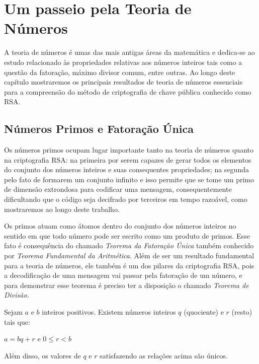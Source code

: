\chapter {Um passeio pela Teoria de N\'umeros}
\label{Num}

\hspace{7mm}A teoria de n\'umeros \'e umas das mais antigas \'areas da matem\'atica e dedica-se ao estudo relacionado \`as propriedades relativas aos n\'umeros inteiros tais como a quest\~ao da fatora\c{c}\~ao, m\'aximo divisor comum, entre outras. Ao longo deste cap\'itulo mostraremos os principais resultados de teoria de n\'umeros essenciais para a compreens\~ao do m\'etodo de criptografia de chave p\'ublica conhecido como RSA.

\section{N\'umeros Primos e Fatora\c{c}\~ao \'Unica}

\hspace{7mm}Os n\'umeros primos ocupam lugar importante tanto na teoria de n\'umeros quanto na criptografia RSA: na primeira por serem capazes de gerar todos os elementos do conjunto dos n\'umeros inteiros e suas consequentes propriedades; na segunda pelo fato de formarem um conjunto infinito e isso permite que se tome um primo de dimens\~ao extrondosa para codificar uma mensagem, consequentemente dificultando que o c\'odigo seja decifrado por terceiros em tempo razo\'avel, como mostraremos ao longo deste trabalho.

Os primos atuam como \'atomos dentro do conjunto dos n\'umeros inteiros no sentido em que todo n\'umero pode ser escrito como um produto de primos. Esse fato \'e consequ\^encia do chamado \textit{Teorema da Fatora\c{c}\~ao \'Unica} tamb\'em conhecido por \textit{Teorema Fundamental da Aritm\'etica}. Al\'em de ser um resultado fundamental para a teoria de n\'umeros, ele tamb\'em \'e um dos pilares da criptografia RSA, pois a decodifica\c{c}\~ao de uma mensagem vai passar pela fatora\c{c}\~ao de um n\'umero, e para demonstrar esse teorema \'e preciso ter a disposi\c{c}\~ao o chamado \textit{Teorema de Divis\~ao}. 


\begin{Th}
Sejam $a$ e $b$ inteiros positivos. Existem n\'umeros inteiros $q$ (quociente) e $r$ (resto) tais que:	
	\begin{center}
		$a=bq+r$ e $0\leq r <b$
	\end{center}
Al\'em disso, os valores de $q$ e $r$ satisfazendo as rela\c{c}\~oes acima s\~ao \'unicos.
\end{Th} 

